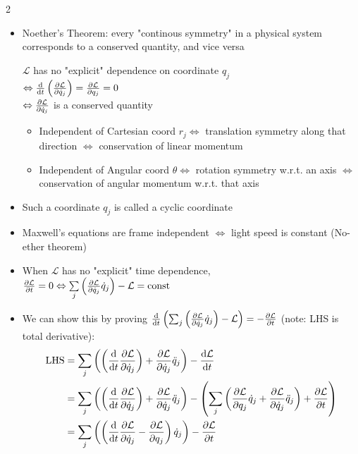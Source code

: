\documentclass[10pt, portrait]{article}
\begin{document}
\begin{multicols*}{2}
\begin{itemize}
    \item Noether's Theorem: every "continous symmetry" in a physical system corresponds to a conserved quantity, and vice versa \\
    \begin{center}
        $\mathcal{L}$ has no "explicit" dependence on coordinate $q_j$ \\
        $\Leftrightarrow \dv{t}\left(\pdv{\mathcal{L}}{\dot{q}_j}\right) = \pdv{\mathcal{L}}{q_j} = 0$ \\
        $\Leftrightarrow \pdv{\mathcal{L}}{\dot{q}_j}$ is a conserved quantity
    \end{center}
    \begin{itemize}
        \item Independent of Cartesian coord $r_j \Leftrightarrow$ translation symmetry along that direction $\Leftrightarrow$ conservation of linear momentum
        \item Independent of Angular coord $\theta \Leftrightarrow$ rotation symmetry w.r.t. an axis $\Leftrightarrow$ conservation of angular momentum w.r.t. that axis
    \end{itemize}
    \item Such a coordinate $q_j$ is called a cyclic coordinate
    \item Maxwell's equations are frame independent $\Leftrightarrow$ light speed is constant (No-ether theorem)
    \item When $\mathcal{L}$ has no "explicit" time dependence, $\pdv{\mathcal{L}}{t} = 0 \Leftrightarrow \underset{j}{\sum}\left(\pdv{\mathcal{L}}{\dot{q}_j} \dot{q}_j\right) - \mathcal{L} = \text{const}$
    \item We can show this by proving $\dv{t}\left(\sum_j\left(\pdv{\mathcal{L}}{\dot{q}_j} \dot{q}_j\right) - \mathcal{L}\right) = -\pdv{\mathcal{L}}{t}$ (note: LHS is total derivative):
    \[
    \begin{aligned}
        \text{LHS} &= \sum_j\left( \left(\dv{t}\pdv{\mathcal{L}}{\dot{q}_j}\right) + \pdv{\mathcal{L}}{\dot{q}_j}\ddot{q}_j \right) - \dv{\mathcal{L}}{t} \\
        &= \sum_j\left( \left(\dv{t}\pdv{\mathcal{L}}{\dot{q}_j}\right) + \pdv{\mathcal{L}}{\dot{q}_j}\ddot{q}_j \right) - \left( \sum_j \left( \pdv{\mathcal{L}}{q_j}\dot{q}_j + \pdv{\mathcal{L}}{\dot{q}_j}\ddot{q}_j\right) + \pdv{\mathcal{L}}{t} \right) \\
        &= \sum_j \left( \left( \dv{t}\pdv{\mathcal{L}}{\dot{q}_j} - \pdv{\mathcal{L}}{q_j} \right)\dot{q}_j \right) -\pdv{\mathcal{L}}{t} \\

\end{aligned}\]
\end{itemize}
\end{multicols*}
\end{document}
